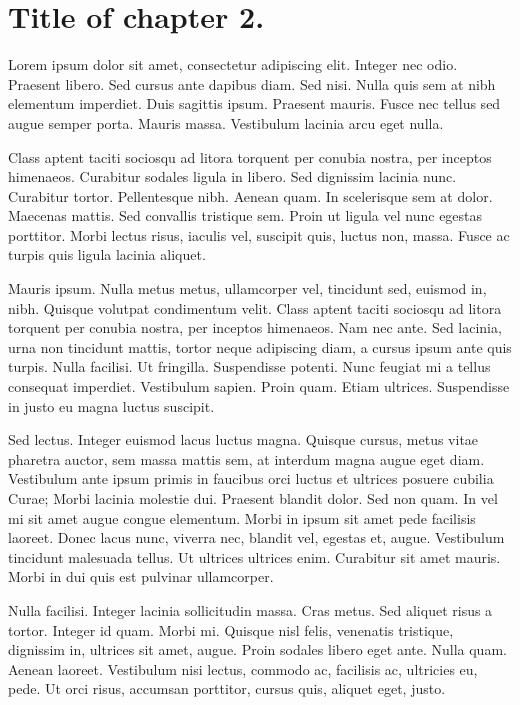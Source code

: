 \chapter{Title of chapter 2.}

Lorem ipsum dolor sit amet, consectetur adipiscing elit. Integer nec
odio. Praesent libero. Sed cursus ante dapibus diam. Sed nisi. Nulla
quis sem at nibh elementum imperdiet. Duis sagittis ipsum. Praesent
mauris. Fusce nec tellus sed augue semper porta. Mauris massa.
Vestibulum lacinia arcu eget nulla.

Class aptent taciti sociosqu ad litora torquent per conubia nostra, per
inceptos himenaeos. Curabitur sodales ligula in libero. Sed dignissim
lacinia nunc. Curabitur tortor. Pellentesque nibh. Aenean quam. In
scelerisque sem at dolor. Maecenas mattis. Sed convallis tristique sem.
Proin ut ligula vel nunc egestas porttitor. Morbi lectus risus, iaculis
vel, suscipit quis, luctus non, massa. Fusce ac turpis quis ligula
lacinia aliquet.

Mauris ipsum. Nulla metus metus, ullamcorper vel, tincidunt sed, euismod
in, nibh. Quisque volutpat condimentum velit. Class aptent taciti
sociosqu ad litora torquent per conubia nostra, per inceptos himenaeos.
Nam nec ante. Sed lacinia, urna non tincidunt mattis, tortor neque
adipiscing diam, a cursus ipsum ante quis turpis. Nulla facilisi. Ut
fringilla. Suspendisse potenti. Nunc feugiat mi a tellus consequat
imperdiet. Vestibulum sapien. Proin quam. Etiam ultrices. Suspendisse in
justo eu magna luctus suscipit.

Sed lectus. Integer euismod lacus luctus magna. Quisque cursus, metus
vitae pharetra auctor, sem massa mattis sem, at interdum magna augue
eget diam. Vestibulum ante ipsum primis in faucibus orci luctus et
ultrices posuere cubilia Curae; Morbi lacinia molestie dui. Praesent
blandit dolor. Sed non quam. In vel mi sit amet augue congue elementum.
Morbi in ipsum sit amet pede facilisis laoreet. Donec lacus nunc,
viverra nec, blandit vel, egestas et, augue. Vestibulum tincidunt
malesuada tellus. Ut ultrices ultrices enim. Curabitur sit amet mauris.
Morbi in dui quis est pulvinar ullamcorper.

Nulla facilisi. Integer lacinia sollicitudin massa. Cras metus. Sed
aliquet risus a tortor. Integer id quam. Morbi mi. Quisque nisl felis,
venenatis tristique, dignissim in, ultrices sit amet, augue. Proin
sodales libero eget ante. Nulla quam. Aenean laoreet. Vestibulum nisi
lectus, commodo ac, facilisis ac, ultricies eu, pede. Ut orci risus,
accumsan porttitor, cursus quis, aliquet eget, justo.

